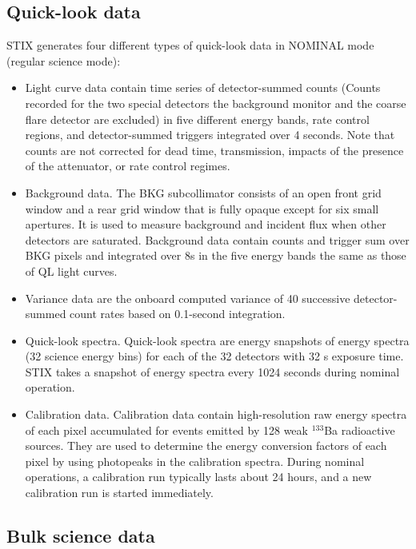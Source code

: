 \documentclass[referee]{aa} %
\begin{document}
\subsection{Quick-look data}
STIX generates four different types of quick-look data in NOMINAL mode (regular science mode):
\begin{itemize}
\item Light curve data contain time series 
of detector-summed counts (Counts recorded for the two 
special detectors  the background monitor and the coarse flare detector are excluded) 
in five different energy bands, rate control regions, and detector-summed triggers 
integrated over 4 seconds. Note that counts are not corrected for dead time,  transmission, impacts of the presence of the attenuator, 
or rate control regimes.

\item Background data. 
The BKG subcollimator consists of an open front grid window
and a rear grid window that is fully opaque except for six small
apertures. It is used to measure background and incident flux when other detectors are saturated.  
Background data contain counts and trigger sum over BKG pixels and integrated over 8s in the five energy
bands the same as those of QL light curves. 
\item Variance data are the onboard computed variance of 40 successive detector-summed count rates
based on 0.1-second integration.
\item Quick-look spectra. Quick-look spectra 
 are energy snapshots of energy spectra (32 science energy bins) for
each of the 32 detectors with 32 s exposure time.
STIX takes a snapshot of energy spectra every 1024
seconds during nominal operation.
\item Calibration data. 
Calibration data contain high-resolution raw energy spectra of each pixel accumulated for 
events emitted by 128 weak $^{133}$Ba radioactive sources. 
They are used to determine the energy conversion factors of each pixel by using photopeaks in the calibration spectra.  
During nominal operations, a calibration run typically lasts about 24 hours, and a new calibration run is started immediately. 

\end{itemize}


\subsection{Bulk science data}
\end{document}
